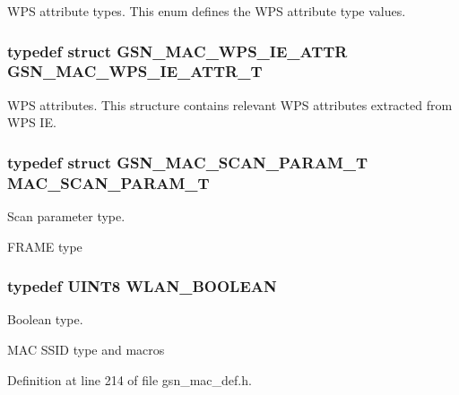 WPS attribute types. This enum defines the WPS attribute type values. 

\hypertarget{a00642_gab0287dd9aaabe07cf4313a9d8a14dcca}{
\subsubsection[{GSN\_\-MAC\_\-WPS\_\-IE\_\-ATTR\_\-T}]{\setlength{\rightskip}{0pt plus 5cm}typedef struct {\bf GSN\_\-MAC\_\-WPS\_\-IE\_\-ATTR}  {\bf GSN\_\-MAC\_\-WPS\_\-IE\_\-ATTR\_\-T}}}
\label{a00642_gab0287dd9aaabe07cf4313a9d8a14dcca}


WPS attributes. This structure contains relevant WPS attributes extracted from WPS IE. 

\hypertarget{a00642_ga224c46962ac3e8d21a5dfc0d1a565391}{
\subsubsection[{MAC\_\-SCAN\_\-PARAM\_\-T}]{\setlength{\rightskip}{0pt plus 5cm}typedef struct {\bf GSN\_\-MAC\_\-SCAN\_\-PARAM\_\-T}  {\bf MAC\_\-SCAN\_\-PARAM\_\-T}}}
\label{a00642_ga224c46962ac3e8d21a5dfc0d1a565391}


Scan parameter type. 

FRAME type \hypertarget{a00642_ga7fb691c78d3a1046fa998bae1560e1a5}{
\subsubsection[{WLAN\_\-BOOLEAN}]{\setlength{\rightskip}{0pt plus 5cm}typedef {\bf UINT8} {\bf WLAN\_\-BOOLEAN}}}
\label{a00642_ga7fb691c78d3a1046fa998bae1560e1a5}


Boolean type. 

MAC SSID type and macros 

Definition at line 214 of file gsn\_\-mac\_\-def.h.



